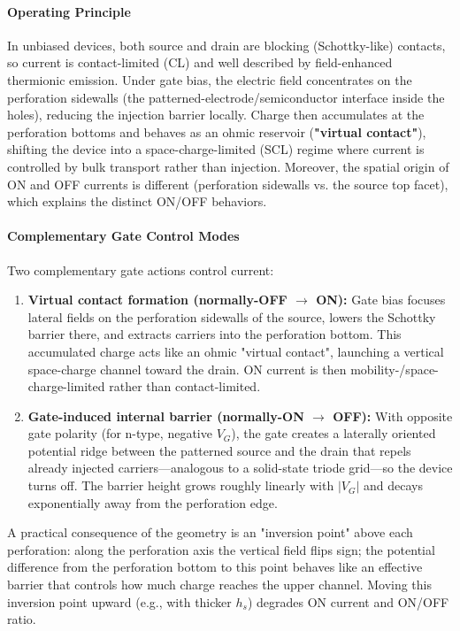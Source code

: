 \documentclass{article}
\begin{document}
\paragraph{Operating Principle}
In unbiased devices, both source and drain are blocking (Schottky-like) contacts, so current is contact-limited (CL) and well described by field-enhanced thermionic emission. Under gate bias, the electric field concentrates on the perforation sidewalls (the patterned-electrode/semiconductor interface inside the holes), reducing the injection barrier locally. Charge then accumulates at the perforation bottoms and behaves as an ohmic reservoir (\textbf{"virtual contact"}), shifting the device into a space-charge-limited (SCL) regime where current is controlled by bulk transport rather than injection. Moreover, the spatial origin of ON and OFF currents is different (perforation sidewalls vs. the source top facet), which explains the distinct ON/OFF behaviors.

\paragraph{Complementary Gate Control Modes}
Two complementary gate actions control current:
\begin{enumerate}
    \item \textbf{Virtual contact formation (normally-OFF $\rightarrow$ ON):}
    Gate bias focuses lateral fields on the perforation sidewalls of the source, lowers the Schottky barrier there, and extracts carriers into the perforation bottom. This accumulated charge acts like an ohmic "virtual contact", launching a vertical space-charge channel toward the drain. ON current is then mobility-/space-charge-limited rather than contact-limited.
    
    \item \textbf{Gate-induced internal barrier (normally-ON $\rightarrow$ OFF):}
    With opposite gate polarity (for n-type, negative $V_G$), the gate creates a laterally oriented potential ridge between the patterned source and the drain that repels already injected carriers—analogous to a solid-state triode grid—so the device turns off. The barrier height grows roughly linearly with $|V_G|$ and decays exponentially away from the perforation edge.
\end{enumerate}

A practical consequence of the geometry is an "inversion point" above each perforation: along the perforation axis the vertical field flips sign; the potential difference from the perforation bottom to this point behaves like an effective barrier that controls how much charge reaches the upper channel. Moving this inversion point upward (e.g., with thicker $h_s$) degrades ON current and ON/OFF ratio.
\end{document}

